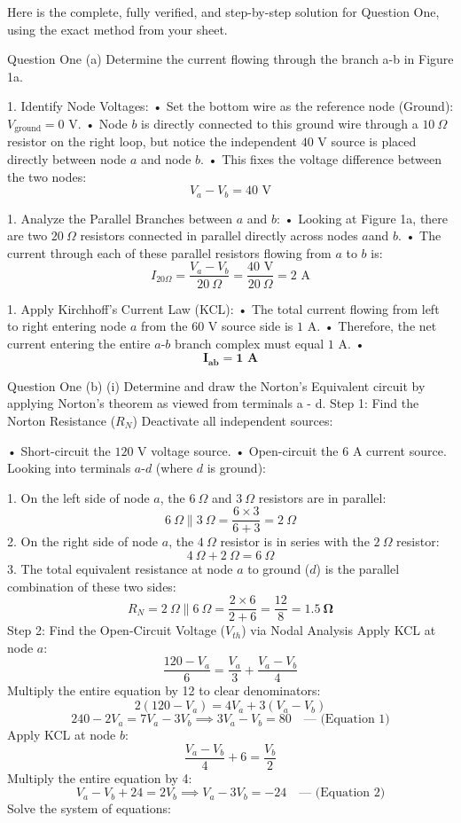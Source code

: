 Here is the complete, fully verified, and step-by-step solution for Question One, using the exact method from your sheet.

Question One (a)
Determine the current flowing through the branch a-b in Figure 1a.

1. Identify Node Voltages:
 • Set the bottom wire as the reference node (Ground): $V_{\text{ground}} = 0\text{ V}$.
 • Node $b$ is directly connected to this ground wire through a $10\ \Omega$ resistor on the right loop, but notice the independent $40\text{ V}$ source is placed directly between node $a$ and node $b$.
 • This fixes the voltage difference between the two nodes:
$$V_a - V_b = 40\text{ V}$$ 

1. Analyze the Parallel Branches between $a$ and $b$:
 • Looking at Figure 1a, there are two $20\ \Omega$ resistors connected in parallel directly across nodes $a$and $b$.
 • The current through each of these parallel resistors flowing from $a$ to $b$ is:
$$I_{20\Omega} = \frac{V_a - V_b}{20\ \Omega} = \frac{40\text{ V}}{20\ \Omega} = 2\text{ A}$$ 

1. Apply Kirchhoff's Current Law (KCL):
 • The total current flowing from left to right entering node $a$ from the $60\text{ V}$ source side is $1\text{ A}$.
 • Therefore, the net current entering the entire $a\text{-}b$ branch complex must equal $1\text{ A}$.
 • $$\mathbf{I_{ab} = 1\text{ A}}$$ 


Question One (b) (i)
Determine and draw the Norton's Equivalent circuit by applying Norton's theorem as viewed from terminals a - d.
Step 1: Find the Norton Resistance ($R_N$)
Deactivate all independent sources:

• Short-circuit the $120\text{ V}$ voltage source.
• Open-circuit the $6\text{ A}$ current source.
Looking into terminals $a\text{-}d$ (where $d$ is ground):

1. On the left side of node $a$, the $6\ \Omega$ and $3\ \Omega$ resistors are in parallel:
$$6\ \Omega \parallel 3\ \Omega = \frac{6 \times 3}{6 + 3} = 2\ \Omega$$ 
2. On the right side of node $a$, the $4\ \Omega$ resistor is in series with the $2\ \Omega$ resistor:
$$4\ \Omega + 2\ \Omega = 6\ \Omega$$ 
3. The total equivalent resistance at node $a$ to ground ($d$) is the parallel combination of these two sides:
$$R_N = 2\ \Omega \parallel 6\ \Omega = \frac{2 \times 6}{2 + 6} = \frac{12}{8} = \mathbf{1.5\ \Omega}$$ 
Step 2: Find the Open-Circuit Voltage ($V_{th}$) via Nodal Analysis
Apply KCL at node $a$:
$$\frac{120 - V_a}{6} = \frac{V_a}{3} + \frac{V_a - V_b}{4}$$ 
Multiply the entire equation by 12 to clear denominators:
$$2(120 - V_a) = 4V_a + 3(V_a - V_b)$$ 
$$240 - 2V_a = 7V_a - 3V_b \implies 3V_a - V_b = 80 \quad \text{--- (Equation 1)}$$ 
Apply KCL at node $b$:
$$\frac{V_a - V_b}{4} + 6 = \frac{V_b}{2}$$ 
Multiply the entire equation by 4:
$$V_a - V_b + 24 = 2V_b \implies V_a - 3V_b = -24 \quad \text{--- (Equation 2)}$$ 
Solve the system of equations:

